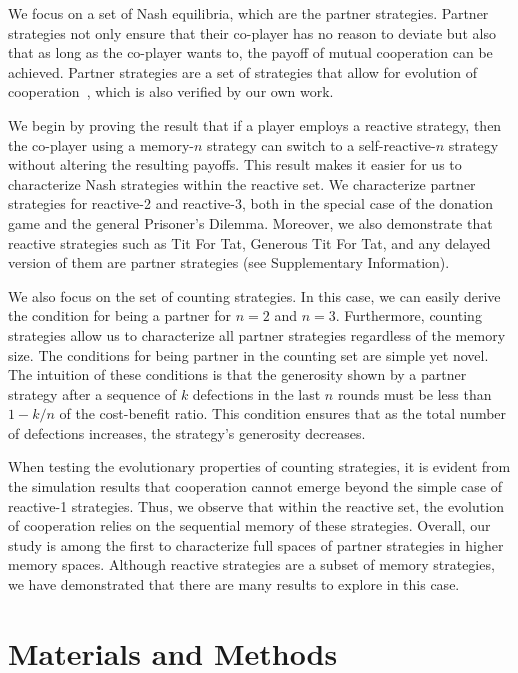 \documentclass[11pt]{article}
\begin{document}
We focus on a set of Nash equilibria, which are the partner strategies. Partner
strategies not only ensure that their co-player has no reason to deviate but
also that as long as the co-player wants to, the payoff of mutual cooperation
can be achieved. Partner strategies are a set of strategies that
allow for evolution of cooperation~\cite{hilbe:Nature:2018},
which is also verified by our own work.

We begin by proving the result that if a player employs a reactive strategy,
then the co-player using a memory-$n$ strategy can switch to a self-reactive-$n$
strategy without altering the resulting payoffs. This result makes it easier for
us to characterize Nash strategies within the reactive set. We characterize
partner strategies for reactive-2 and reactive-3, both in the special case of
the donation game and the general Prisoner's Dilemma. Moreover, we also
demonstrate that reactive strategies such as Tit For Tat, Generous Tit For Tat,
and any delayed version of them are partner strategies (see Supplementary
Information).

We also focus on the set of counting strategies. In this case, we can easily
derive the condition for being a partner for $n=2$ and $n=3$. Furthermore,
counting strategies allow us to characterize all partner strategies regardless
of the memory size. The conditions for being partner in the counting set are
simple yet novel. The intuition of these conditions is that the generosity shown
by a partner strategy after a sequence of $k$ defections in the last $n$ rounds
must be less than $1 - k/n$ of the cost-benefit ratio. This condition ensures
that as the total number of defections increases, the strategy's generosity
decreases.

When testing the evolutionary properties of counting strategies, it is evident
from the simulation results that cooperation cannot emerge beyond the simple
case of reactive-1 strategies. Thus, we observe that within the reactive set,
the evolution of cooperation relies on the sequential memory of these strategies.
Overall, our study is among the first to characterize full spaces of partner
strategies in higher memory spaces. Although reactive strategies are a subset of
memory strategies, we have demonstrated that there are many results to explore
in this case.

\section*{Materials and Methods}\label{section:materials_and_methods}
\end{document}
